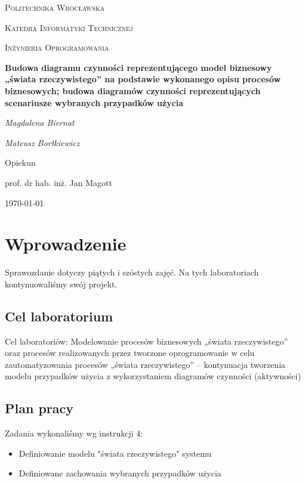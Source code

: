 \documentclass{article}
\begin{document}
	
	\begin{titlepage}
		\centering
		{\scshape\LARGE Politechnika Wrocławska \par}
		{\scshape\Large Katedra Informatyki Technicznej\par}
		
		\vspace{1cm}
		{\scshape\Large Inżynieria Oprogramowania\par}
		\vspace{1.5cm}
		{\huge\bfseries Budowa diagramu czynności reprezentującego model
			biznesowy „świata rzeczywistego” na podstawie
			wykonanego opisu procesów biznesowych; budowa
			diagramów czynności reprezentujących scenariusze
			wybranych przypadków użycia\par}
		\vspace{2cm}
		{\Large\itshape Magdalena Biernat\par}
		{\Large\itshape Mateusz Bortkiewicz\par}
		\vfill
		Opiekun\par
		prof. dr hab. inż. Jan Magott 
		
		\vfill
		{\large \today\par}
	\end{titlepage}
	\newpage
	
	\section{Wprowadzenie}
	Sprawozdanie dotyczy piątych i szóstych zajęć. Na tych laboratoriach kontynuowaliśmy swój projekt. 
	
	\subsection{Cel laboratorium}
Cel laboratoriów:
Modelowanie procesów biznesowych „świata rzeczywistego” oraz
procesów realizowanych przez tworzone oprogramowanie w celu
zautomatyzowania procesów „świata rzeczywistego” – kontynuacja
tworzenia modelu przypadków użycia z wykorzystaniem diagramów
czynności (aktywności)
	
	\subsection{Plan pracy}
	Zadania wykonaliśmy wg instrukcji 4:

	\begin{itemize}
		\item Definiowanie modelu "świata rzeczywistego" systemu
		\item Definiowane zachowania wybranych przypadków użycia
	\end{itemize}
\newpage
\end{document}
